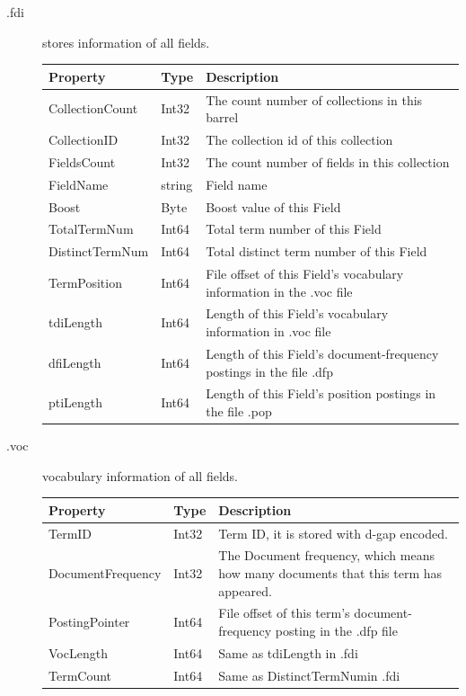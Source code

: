 \begin{description}
\item[.fdi] stores information of all fields.

{\scriptsize
\selectfont
\begin{tabular}{ p{}|p{}|p{}}
\textbf{Property} & \textbf{Type} & \textbf{Description}\\
\hline

CollectionCount & Int32 & The count number of collections in this barrel\\
CollectionID & Int32 & The collection id of this collection\\
FieldsCount & Int32 & The count number of fields in this collection\\
FieldName  & string & Field name\\ 
Boost  & Byte  & Boost value of this Field\\
TotalTermNum  & Int64  & Total term number of this Field\\
DistinctTermNum  & Int64  & Total distinct term number of this Field\\
TermPosition  & Int64  & File offset of this Field's vocabulary information in the .voc file\\
tdiLength  & Int64  & Length of this Field's vocabulary information in .voc file\\
dfiLength  & Int64  & Length of this Field's document-frequency postings in the file .dfp\\
ptiLength  & Int64  & Length of this Field's position postings in the file .pop\\

\end{tabular}
}
\item[.voc] vocabulary information of all fields.

{\scriptsize
\selectfont
\begin{tabular}{ p{}|p{}|p{}}
\textbf{Property} & \textbf{Type} & \textbf{Description}\\
\hline
TermID & Int32 & Term ID, it is stored with d-gap encoded.\\
DocumentFrequency & Int32 & The Document frequency, which means how many documents that this term has appeared.\\
PostingPointer & Int64 & File offset of this term's document-frequency posting in the .dfp file\\
VocLength  & Int64 & Same as tdiLength in .fdi\\ 
TermCount  & Int64 & Same as DistinctTermNumin .fdi\\
\end{tabular}
}


\end{description}
